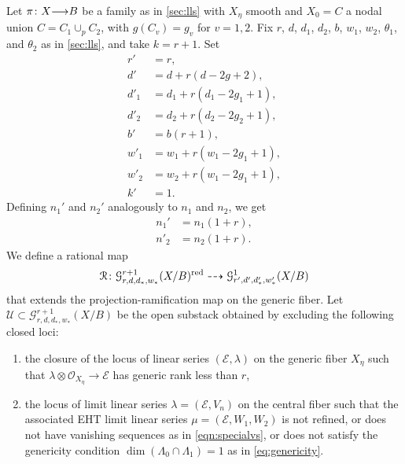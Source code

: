 \documentclass[11pt,reqno]{amsart}
\theoremstyle{plain}
\theoremstyle{definition}
\theoremstyle{remark}
\numberwithin{equation}{section}
\renewcommand{\to}{{\longrightarrow}}
\numberwithin{equation}{section}
\renewcommand{\O}{\mathcal O}
\begin{document}
Let $\pi \from X \to B$ be a family as in \autoref{sec:lls} with $X_\eta$ smooth and $X_0 = C$ a nodal union $C = C_1 \cup_p C_2$, with $g(C_v) = g_v$ for $v = 1,2$.
Fix $r$, $d$, $d_1$, $d_2$, $b$, $w_1$, $w_2$, $\theta_1$, and $\theta_2$ as in \autoref{sec:lls}, and take $k = r+1$.
Set
\begin{align*}
  r' &= r,\\
  d' &= d + r(d-2g+2),\\ 
  d'_1 &= d_1 + r(d_1-2g_1+1),\\
  d'_2 &= d_2 + r(d_2-2g_2+1),\\
  b' &= b(r+1),\\
  w'_1 &= w_1 + r(w_1-2g_1+1),\\
  w'_2 &= w_2 + r(w_1-2g_1+1),\\
  k' &= 1.
\end{align*}
Defining $n_1'$ and $n_2'$ analogously to $n_1$ and $n_2$, we get
\begin{align*}
  n_1' &= n_1 (1+r), \\
  n'_2 &= n_2(1+r).
\end{align*}
We define a rational map 
\begin{equation}\label{eq:Rtilde}
  \mathcal R {\colon} {\mathcal G}^{r+1}_{r,d,d_*,w_*}(X/B)^{\rm red} \dashrightarrow {\mathcal G}^{1}_{r',d',d'_*,w'_*}(X/B)
\end{equation}
that extends the projection-ramification map on the generic fiber.
Let $\mathcal U \subset {\mathcal G}^{r+1}_{r,d,d_*,w_*}(X/B)$ be the open substack obtained by excluding the following closed loci:
\begin{enumerate}
\item the closure of the locus of linear series $(\mathcal E, \lambda)$ on the generic fiber $X_\eta$ such that $\lambda \otimes \O_{X_\eta} \to \mathcal E$ has generic rank less than $r$,
\item the locus of limit linear series $\lambda = (\mathcal E, V_n)$ on the central fiber such that the associated EHT limit linear series $\mu = (\mathcal E, W_1, W_2)$ is not refined, or does not have vanishing sequences as in \eqref{eqn:specialvs}, or does not satisfy the genericity condition $\dim (\Lambda_0 \cap \Lambda_1) = 1$ as in \eqref{eq:genericity}.
\end{enumerate}
\end{document}
